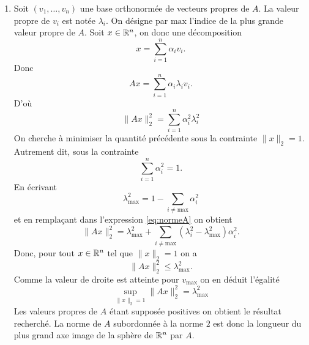 \documentclass[11pt, a4paper]{article}
\begin{document}
\begin{solution}
  \begin{enumerate}
  \item Soit $(v_1, \ldots, v_n)$ une base orthonormée de vecteurs
    propres de $A$. La valeur propre de $v_i$ est notée
    $\lambda_i$. On désigne par $\text{max}$ l'indice de la plus
    grande valeur propre de $A$. Soit $x \in \mathbb{R}^n$, on donc une
    décomposition
    \[ 
    x = \sum_{i=1}^n \alpha_iv_i.
    \]
    Donc 
    \[
    Ax = \sum_{i=1}^n \alpha_i\lambda_iv_i.
    \]
    D'où
    \begin{equation}
      \label{eq:normeA}
      \|Ax\|_2^2 = \sum_{i=1}^n \alpha_i^2\lambda_i^2
    \end{equation}
    On cherche à minimiser la quantité précédente sous la contrainte
    $\|x\|_2 = 1$. Autrement dit, sous la contrainte
    \[
    \sum_{i=1}^n\alpha_i^2 = 1.
    \]
    En écrivant 
    \[
    \lambda_{\text{max}}^2 = 1 - \sum_{i\neq \text{max}}\alpha_i^2 
    \]
    et en rempla\c{c}ant dans l'expression \eqref{eq:normeA} on
    obtient
    \[
    \|Ax\|_2^2 = 
    \lambda_{\text{max}}^2 + 
    \sum_{i \neq \text{max}} (\lambda_i^2 - \lambda_{\text{max}}^2)\alpha_i^2.
    \]
    Donc, pour tout $x \in \mathbb{R}^n$ tel que $\|x\|_2 = 1$ on a 
    \[
    \|Ax\|_2^2 \leq \lambda_{\text{max}}^2.
    \]
    Comme la valeur de droite est atteinte pour $v_{\text{max}}$ on en
    déduit l'égalité 
    \[
    \sup_{\|x\|_2 = 1}\|Ax\|_2^2 = \lambda_{\text{max}}^2
    \]
    Les valeurs propres de $A$ étant supposée positives on obtient le
    résultat recherché. La norme de $A$ subordonnée à la norme $2$ est
    donc la longueur du plus grand axe image de la sphère de $\mathbb{R}^n$
    par $A$.
  \end{enumerate}
\end{solution}
\end{document}

